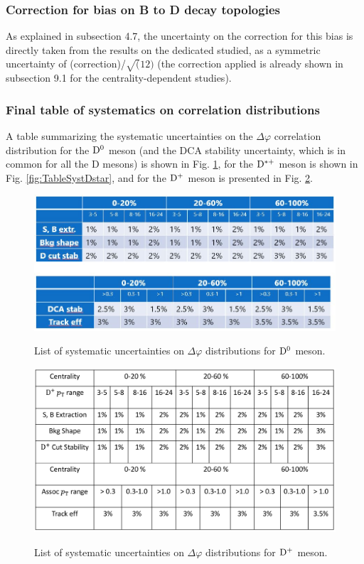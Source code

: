 \subsubsection{Correction for bias on B to D decay topologies}
As explained in subsection 4.7, the uncertainty on the correction for this bias is directly taken from the results on the dedicated studied, as a symmetric uncertainty of (correction)/$\sqrt(12)$ (the correction applied is already shown in subsection 9.1 for the centrality-dependent studies).

\subsubsection{Final table of systematics on correlation distributions}
A table summarizing the systematic uncertainties on the $\Delta\varphi$ correlation distribution for the ${\rm D^0}$ meson (and the DCA stability uncertainty, which is in common for all the D mesons) is shown in Fig. \ref{fig:TableSystDzero}, for the ${\rm D^{*+}}$ meson is shown in Fig. \ref{fig:TableSystDstar}, and for the ${\rm D^+}$ meson is presented in Fig. \ref{fig:TableSystDplus}.

\begin{figure}
\centering
{\includegraphics[width=0.95\linewidth]{figuresVsCent/Dzero/D0mesonUncert.JPG}}
\caption{List of systematic uncertainties on $\Delta\varphi$ distributions for ${\rm D^0}$ meson.}
\label{fig:TableSystDzero}
\end{figure}


\begin{figure}
\centering
{\includegraphics[width=0.95\linewidth]{Centrality_DPlus/Dplus/Dplus_Systematic_Centrality.png}}
\caption{List of systematic uncertainties on $\Delta\varphi$ distributions for ${\rm D^+}$ meson.}
\label{fig:TableSystDplus}
\end{figure}

